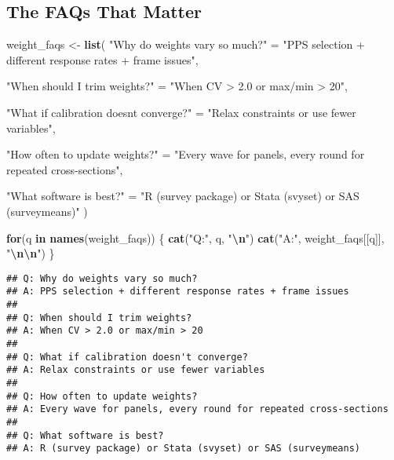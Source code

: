 \documentclass[
]{article}
\newenvironment{Shaded}{\begin{snugshade}}{\end{snugshade}}
\newcommand{\ControlFlowTok}[1]{\textcolor[rgb]{0.13,0.29,0.53}{\textbf{#1}}}
\newcommand{\FunctionTok}[1]{\textcolor[rgb]{0.13,0.29,0.53}{\textbf{#1}}}
\newcommand{\NormalTok}[1]{#1}
\newcommand{\OtherTok}[1]{\textcolor[rgb]{0.56,0.35,0.01}{#1}}
\newcommand{\SpecialCharTok}[1]{\textcolor[rgb]{0.81,0.36,0.00}{\textbf{#1}}}
\newcommand{\StringTok}[1]{\textcolor[rgb]{0.31,0.60,0.02}{#1}}
\begin{document}
\subsection{The FAQs That Matter}\label{the-faqs-that-matter}

\begin{Shaded}
\begin{Highlighting}[]
\NormalTok{weight\_faqs }\OtherTok{\textless{}{-}} \FunctionTok{list}\NormalTok{(}
  \StringTok{"Why do weights vary so much?"} \OtherTok{=} 
    \StringTok{"PPS selection + different response rates + frame issues"}\NormalTok{,}
  
  \StringTok{"When should I trim weights?"} \OtherTok{=} 
    \StringTok{"When CV \textgreater{} 2.0 or max/min \textgreater{} 20"}\NormalTok{,}
  
  \StringTok{"What if calibration doesn\textquotesingle{}t converge?"} \OtherTok{=} 
    \StringTok{"Relax constraints or use fewer variables"}\NormalTok{,}
  
  \StringTok{"How often to update weights?"} \OtherTok{=} 
    \StringTok{"Every wave for panels, every round for repeated cross{-}sections"}\NormalTok{,}
  
  \StringTok{"What software is best?"} \OtherTok{=} 
    \StringTok{"R (survey package) or Stata (svyset) or SAS (surveymeans)"}
\NormalTok{)}

\ControlFlowTok{for}\NormalTok{(q }\ControlFlowTok{in} \FunctionTok{names}\NormalTok{(weight\_faqs)) \{}
  \FunctionTok{cat}\NormalTok{(}\StringTok{"Q:"}\NormalTok{, q, }\StringTok{"}\SpecialCharTok{\textbackslash{}n}\StringTok{"}\NormalTok{)}
  \FunctionTok{cat}\NormalTok{(}\StringTok{"A:"}\NormalTok{, weight\_faqs[[q]], }\StringTok{"}\SpecialCharTok{\textbackslash{}n\textbackslash{}n}\StringTok{"}\NormalTok{)}
\NormalTok{\}}
\end{Highlighting}
\end{Shaded}

\begin{verbatim}
## Q: Why do weights vary so much? 
## A: PPS selection + different response rates + frame issues 
## 
## Q: When should I trim weights? 
## A: When CV > 2.0 or max/min > 20 
## 
## Q: What if calibration doesn't converge? 
## A: Relax constraints or use fewer variables 
## 
## Q: How often to update weights? 
## A: Every wave for panels, every round for repeated cross-sections 
## 
## Q: What software is best? 
## A: R (survey package) or Stata (svyset) or SAS (surveymeans)
\end{verbatim}
\end{document}
